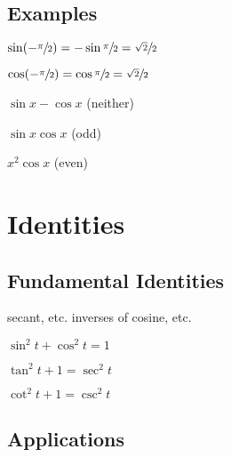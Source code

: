 \documentclass{exam}
\begin{document}
  \subsection{Examples}
  \begin{itemize*}
    \item $\sin (- \sfrac{\pi}{2}) = - \sin \sfrac{\pi}{2} = \sfrac{\sqrt{2}}{2}$
    \item $\cos (- \sfrac{\pi}{2}) = \cos \sfrac{\pi}{2} = \sfrac{\sqrt{2}}{2}$

    \item $\sin x - \cos x$ (neither)
    \item $\sin x \cos x$ (odd)
    \item $x^2 \cos x$ (even)
  \end{itemize*}

  \section{Identities}

  \subsection{Fundamental Identities}
  \begin{itemize*}
    \item secant, etc. inverses of cosine, etc.
    \item $\sin^2 t + \cos^2 t = 1$
    \item $\tan^2 t + 1 = \sec^2 t$
    \item $\cot^2 t + 1 = \csc^2 t$
  \end{itemize*}

  \subsection{Applications}
\end{document}
